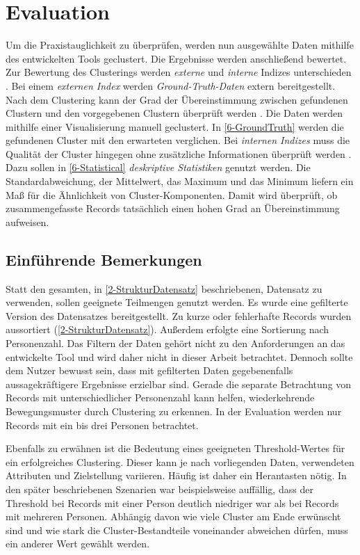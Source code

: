 \chapter{Evaluation}
\label{chapter6}
Um die Praxistauglichkeit zu überprüfen, werden nun ausgewählte Daten
mithilfe des entwickelten Tools geclustert.
Die Ergebnisse werden anschließend bewertet.
Zur Bewertung des Clusterings werden \emph{externe}
und \emph{interne} Indizes unterschieden \citep{aghabozorgi_time-series_2015, warren_liao_clustering_2005}.
Bei einem \emph{externen Index} werden \emph{Ground-Truth-Daten} extern bereitgestellt.
Nach dem Clustering kann der Grad der Übereinstimmung zwischen gefundenen Clustern
und den vorgegebenen Clustern überprüft werden \citep{aghabozorgi_time-series_2015, warren_liao_clustering_2005}.
Die Daten werden mithilfe einer Visualisierung manuell geclustert.
In \autoref{6-GroundTruth} werden die gefundenen Cluster mit den erwarteten verglichen.
Bei \emph{internen Indizes} muss die Qualität der Cluster hingegen
ohne zusätzliche Informationen überprüft werden \citep{aghabozorgi_time-series_2015, warren_liao_clustering_2005}.
Dazu sollen in \autoref{6-Statistical} \emph{deskriptive Statistiken} genutzt werden.
Die Standardabweichung, der Mittelwert, das Maximum und das Minimum liefern
ein Maß für die Ähnlichkeit von Cluster-Komponenten.
Damit wird überprüft,
ob zusammengefasste Records tatsächlich einen hohen Grad an Übereinstimmung aufweisen.

\section{Einführende Bemerkungen}
\label{6-Bemerkungen}
Statt den gesamten, in \autoref{2-StrukturDatensatz} beschriebenen, Datensatz zu verwenden,
sollen geeignete Teilmengen genutzt werden.
Es wurde eine gefilterte Version des Datensatzes bereitgestellt.
Zu kurze oder fehlerhafte Records wurden aussortiert (\autoref{2-StrukturDatensatz}).
Außerdem erfolgte eine Sortierung nach Personenzahl.
Das Filtern der Daten gehört nicht zu den Anforderungen an das entwickelte Tool
und wird daher nicht in dieser Arbeit betrachtet.
Dennoch sollte dem Nutzer bewusst sein,
dass mit gefilterten Daten gegebenenfalls aussagekräftigere Ergebnisse erzielbar sind.
Gerade die separate Betrachtung von Records mit unterschiedlicher Personenzahl kann helfen,
wiederkehrende Bewegungsmuster durch Clustering zu erkennen.
In der Evaluation werden nur Records mit ein bis drei Personen betrachtet.

Ebenfalls zu erwähnen ist die Bedeutung eines geeigneten Threshold-Wertes für ein erfolgreiches Clustering.
Dieser kann je nach vorliegenden Daten, verwendeten Attributen und Zielstellung variieren.
Häufig ist daher ein {\glqq Herantasten\grqq} nötig.
In den später beschriebenen Szenarien war beispielsweise auffällig,
dass der Threshold bei Records mit einer Person deutlich niedriger war
als bei Records mit mehreren Personen.
Abhängig davon wie viele Cluster am Ende erwünscht sind
und wie stark die Cluster-Bestandteile voneinander abweichen dürfen,
muss ein anderer Wert gewählt werden.

